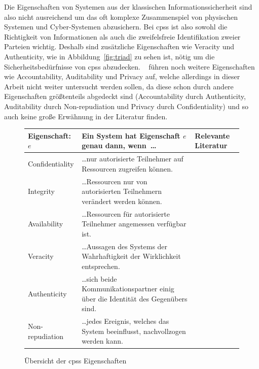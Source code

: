 \documentclass[final,bibliography=totocnumbered]{include/sikseminar}
\newcommand{\cps}{\glspl{cps}\xspace}
\begin{document}
    Die Eigenschaften von Systemen aus der klassischen Informationssicherheit sind also nicht ausreichend um das oft komplexe Zusammenspiel von physischen Systemen und Cyber-Systemen abzusichern.
    Bei \cps ist also sowohl die Richtigkeit von Informationen als auch die zweifelsfreie Identifikation zweier Parteien wichtig.
    Deshalb sind zusätzliche Eigenschaften wie Veracity und Authenticity, wie in Abbildung~\ref{fig:triad} zu sehen ist, nötig um die Sicherheitsbedürfnisse von \cps abzudecken.
    \citeauthor{CH13}~\cite{CH13} führen noch weitere Eigenschaften wie Accountability, Auditability und Privacy auf, welche allerdings in dieser Arbeit nicht weiter untersucht werden sollen, da diese schon durch andere Eigenschaften größtenteils abgedeckt sind (Accountability durch Authenticity, Auditability durch Non-repudiation und Privacy durch Confidentiality) und so auch keine große Erwähnung in der Literatur finden.

    \begin{figure}[ht]
        \centering
        \begin{tabu}
            to \linewidth { | l | X[6,l] | X[1.1,l] | }
            \hline
            Eigenschaft: $e$&Ein System hat Eigenschaft $e$ genau dann, wenn~\ldots&Relevante Literatur \\
            \hline
            Confidentiality&
            \ldots nur autorisierte Teilnehmer auf Ressourcen zugreifen können.&
            \cite{CH13} \\
            \hline
            Integrity&
            \ldots Ressourcen nur von autorisierten Teilnehmern verändert werden können.&
            \cite{CH13} \\
            \hline
            Availability&
            \ldots Ressourcen für autorisierte Teilnehmer angemessen verfügbar ist.&
            \cite{CH13} \\
            \hline
            Veracity &
            \ldots Aussagen des Systems der Wahrhaftigkeit der Wirklichkeit entsprechen.&
            \cite{KLG15} \cite{GK16}\\
            \hline
            Authenticity&
            \ldots sich beide Kommunikationspartner einig über die Identität des Gegenübers sind.&
            \cite{SFJ17} \cite{CH13}\\
            \hline
            Non-repudiation &
            \ldots jedes Ereignis, welches das System beeinflusst, nachvollzogen werden kann.&
            \cite{CH13} \cite{SFJ17} \cite{Ross15} \\
            \hline
        \end{tabu}
        \caption{Übersicht der \cps Eigenschaften}
        \label{fig:table}
    \end{figure}
\end{document}
